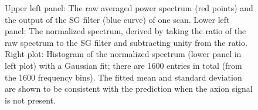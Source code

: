 \begin{figure} [htbp]
  \caption{Upper left panel: The raw averaged power spectrum (red points) and the 
output of the SG filter (blue curve) of one scan. Lower left panel: The normalized 
spectrum,  derived by taking the ratio of the raw spectrum to the SG filter 
and subtracting unity from the ratio.
Right plot: Histogram of the normalized spectrum (lower panel in left plot) with a Gaussian 
fit; there are 1600 entries in total (from the 1600 frequency bins). 
The fitted mean and standard deviation are shown to be consistent with the prediction 
when the axion signal is not present.}
  \label{fig:raw_sg_power}
\end{figure}







